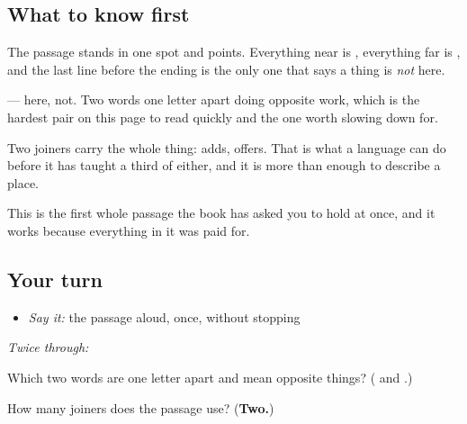 \subsection*{What to know first}
The passage stands in one spot and points. Everything near is \textbf{}, everything far is \textbf{}, and the last line before the ending is the only one that says a thing is \emph{not} here.

\textbf{ } — here, not. Two words one letter apart doing opposite work, which is the hardest pair on this page to read quickly and the one worth slowing down for.

Two joiners carry the whole thing: \textbf{} adds, \textbf{} offers. That is what a language can do before it has taught a third of either, and it is more than enough to describe a place.

This is the first whole passage the book has asked you to hold at once, and it works because everything in it was paid for.

\subsection*{Your turn}
\begin{itemize}
\raggedright
  \item \emph{Say it:} the passage aloud, once, without stopping
\end{itemize}

\emph{Twice through:}

\begin{tcolorbox}[breakable,colback=teal!4,colframe=teal!35!black,title={Before you move on}]
Which two words are one letter apart and mean opposite things? (\textbf{} and \textbf{}.)

How many joiners does the passage use? (\textbf{Two.})
\end{tcolorbox}
